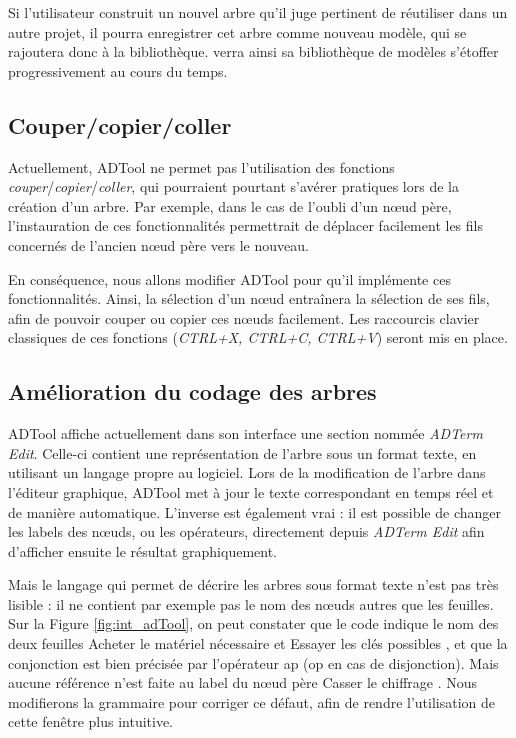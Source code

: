 		
		Si l'utilisateur construit un nouvel arbre qu'il juge pertinent de réutiliser dans un autre projet, il pourra enregistrer cet arbre comme nouveau modèle, qui se rajoutera donc à la bibliothèque. \glasir{} verra ainsi sa bibliothèque de modèles s'étoffer progressivement au cours du temps.


	
	\subsection{Couper/copier/coller}	
		Actuellement, ADTool ne permet pas l'utilisation des fonctions \emph{couper}/\emph{copier}/\emph{coller}, qui pourraient pourtant s'avérer pratiques lors de la création d'un arbre. Par exemple, dans le cas de l'oubli d'un nœud père, l'instauration de ces fonctionnalités permettrait de déplacer facilement les fils concernés de l'ancien nœud père vers le nouveau.
		
		En conséquence, nous allons modifier ADTool pour qu'il implémente ces fonctionnalités. Ainsi, la sélection d'un nœud entraînera la sélection de ses fils, afin de pouvoir couper ou copier ces nœuds facilement. Les raccourcis clavier \og classiques \fg{}  de ces fonctions (\emph{CTRL+X, CTRL+C, CTRL+V}) seront mis en place.


	\subsection{Amélioration du codage des arbres}
		ADTool affiche actuellement dans son interface une section nommée \emph{ADTerm Edit}. Celle-ci contient une représentation de l'arbre sous un format texte, en utilisant un langage propre au logiciel. Lors de la modification de l'arbre dans l'éditeur graphique, ADTool met à jour le texte correspondant en temps réel et de manière automatique. L'inverse est également vrai : il est possible de changer les labels des nœuds, ou les opérateurs, directement depuis \emph{ADTerm Edit} afin d'afficher ensuite le résultat graphiquement.

		Mais le langage qui permet de décrire les arbres sous format texte n'est pas très lisible : il ne contient par exemple pas le nom des nœuds autres que les feuilles. Sur la {\sc Figure} \ref{fig:int_adTool}, on peut constater que le code indique le nom des deux feuilles \og Acheter le matériel nécessaire \fg{} et \og Essayer les clés possibles \fg{}, et que la conjonction est bien précisée par l'opérateur \og ap \fg{} (\og op \fg{} en cas de disjonction). Mais aucune référence n'est faite au label du nœud père \og Casser le chiffrage \fg{}. Nous modifierons la grammaire pour corriger ce défaut, afin de rendre l'utilisation de cette fenêtre plus intuitive.


